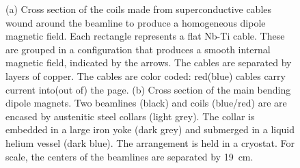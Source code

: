 \begin{figure}[h!]
\captionsetup[subfigure]{position=b}
\centering
{}
\caption{(a) Cross section of the coils made from superconductive cables wound around the beamline to produce a homogeneous dipole magnetic field. Each rectangle represents a flat Nb-Ti cable. These are grouped in a configuration that produces a smooth internal magnetic field, indicated by the arrows. The cables are separated by layers of copper. The cables are color coded: red(blue) cables carry current into(out of) the page. (b) Cross section of the main bending dipole magnets. Two beamlines (black) and coils (blue/red) are are encased by austenitic steel collars (light grey). The collar is embedded in a large iron yoke (dark grey) and submerged in a liquid helium vessel (dark blue). The arrangement is held in a cryostat. For scale, the centers of the beamlines are separated by 19~cm.
}
\label{fig:dipoleFlux}
\end{figure}

